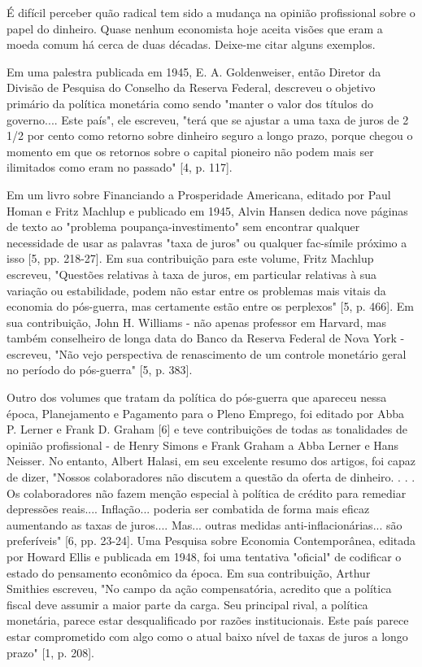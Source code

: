 \documentclass[12pt]{article}
\begin{document}
É difícil perceber quão radical tem sido a mudança na opinião profissional sobre o papel do dinheiro. Quase nenhum economista hoje aceita visões que eram a moeda comum há cerca de duas décadas. Deixe-me citar alguns exemplos.

Em uma palestra publicada em 1945, E. A. Goldenweiser, então Diretor da Divisão de Pesquisa do Conselho da Reserva Federal, descreveu o objetivo primário da política monetária como sendo "manter o valor dos títulos do governo.... Este país", ele escreveu, "terá que se ajustar a uma taxa de juros de 2 1/2 por cento como retorno sobre dinheiro seguro a longo prazo, porque chegou o momento em que os retornos sobre o capital pioneiro não podem mais ser ilimitados como eram no passado" [4, p. 117].

Em um livro sobre Financiando a Prosperidade Americana, editado por Paul Homan e Fritz Machlup e publicado em 1945, Alvin Hansen dedica nove páginas de texto ao "problema poupança-investimento" sem encontrar qualquer necessidade de usar as palavras "taxa de juros" ou qualquer fac-símile próximo a isso [5, pp. 218-27]. Em sua contribuição para este volume, Fritz Machlup escreveu, "Questões relativas à taxa de juros, em particular relativas à sua variação ou estabilidade, podem não estar entre os problemas mais vitais da economia do pós-guerra, mas certamente estão entre os perplexos" [5, p. 466]. Em sua contribuição, John H. Williams - não apenas professor em Harvard, mas também conselheiro de longa data do Banco da Reserva Federal de Nova York - escreveu, "Não vejo perspectiva de renascimento de um controle monetário geral no período do pós-guerra" [5, p. 383].

Outro dos volumes que tratam da política do pós-guerra que apareceu nessa época, Planejamento e Pagamento para o Pleno Emprego, foi editado por Abba P. Lerner e Frank D. Graham [6] e teve contribuições de todas as tonalidades de opinião profissional - de Henry Simons e Frank Graham a Abba Lerner e Hans Neisser. No entanto, Albert Halasi, em seu excelente resumo dos artigos, foi capaz de dizer, "Nossos colaboradores não discutem a questão da oferta de dinheiro. . . . Os colaboradores não fazem menção especial à política de crédito para remediar depressões reais.... Inflação... poderia ser combatida de forma mais eficaz aumentando as taxas de juros.... Mas... outras medidas anti-inflacionárias... são preferíveis" [6, pp. 23-24]. Uma Pesquisa sobre Economia Contemporânea, editada por Howard Ellis e publicada em 1948, foi uma tentativa "oficial" de codificar o estado do pensamento econômico da época. Em sua contribuição, Arthur Smithies escreveu, "No campo da ação compensatória, acredito que a política fiscal deve assumir a maior parte da carga. Seu principal rival, a política monetária, parece estar desqualificado por razões institucionais. Este país parece estar comprometido com algo como o atual baixo nível de taxas de juros a longo prazo" [1, p. 208].
\end{document}
